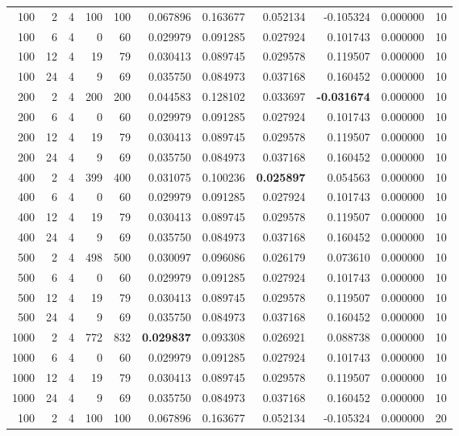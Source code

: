 \begin{table}
\begin{tabular}{rrrrrrrrrrr}
100 & 2 & 4 & 100 & 100 & 0.067896 & 0.163677 & 0.052134 & -0.105324 & 0.000000 & 10 \\
100 & 6 & 4 & 0 & 60 & 0.029979 & 0.091285 & 0.027924 & 0.101743 & 0.000000 & 10 \\
100 & 12 & 4 & 19 & 79 & 0.030413 & 0.089745 & 0.029578 & 0.119507 & 0.000000 & 10 \\
100 & 24 & 4 & 9 & 69 & 0.035750 & 0.084973 & 0.037168 & 0.160452 & 0.000000 & 10 \\
200 & 2 & 4 & 200 & 200 & 0.044583 & 0.128102 & 0.033697 & \textbf{-0.031674} & 0.000000 & 10 \\
200 & 6 & 4 & 0 & 60 & 0.029979 & 0.091285 & 0.027924 & 0.101743 & 0.000000 & 10 \\
200 & 12 & 4 & 19 & 79 & 0.030413 & 0.089745 & 0.029578 & 0.119507 & 0.000000 & 10 \\
200 & 24 & 4 & 9 & 69 & 0.035750 & 0.084973 & 0.037168 & 0.160452 & 0.000000 & 10 \\
400 & 2 & 4 & 399 & 400 & 0.031075 & 0.100236 & \textbf{0.025897} & 0.054563 & 0.000000 & 10 \\
400 & 6 & 4 & 0 & 60 & 0.029979 & 0.091285 & 0.027924 & 0.101743 & 0.000000 & 10 \\
400 & 12 & 4 & 19 & 79 & 0.030413 & 0.089745 & 0.029578 & 0.119507 & 0.000000 & 10 \\
400 & 24 & 4 & 9 & 69 & 0.035750 & 0.084973 & 0.037168 & 0.160452 & 0.000000 & 10 \\
500 & 2 & 4 & 498 & 500 & 0.030097 & 0.096086 & 0.026179 & 0.073610 & 0.000000 & 10 \\
500 & 6 & 4 & 0 & 60 & 0.029979 & 0.091285 & 0.027924 & 0.101743 & 0.000000 & 10 \\
500 & 12 & 4 & 19 & 79 & 0.030413 & 0.089745 & 0.029578 & 0.119507 & 0.000000 & 10 \\
500 & 24 & 4 & 9 & 69 & 0.035750 & 0.084973 & 0.037168 & 0.160452 & 0.000000 & 10 \\
1000 & 2 & 4 & 772 & 832 & \textbf{0.029837} & 0.093308 & 0.026921 & 0.088738 & 0.000000 & 10 \\
1000 & 6 & 4 & 0 & 60 & 0.029979 & 0.091285 & 0.027924 & 0.101743 & 0.000000 & 10 \\
1000 & 12 & 4 & 19 & 79 & 0.030413 & 0.089745 & 0.029578 & 0.119507 & 0.000000 & 10 \\
1000 & 24 & 4 & 9 & 69 & 0.035750 & 0.084973 & 0.037168 & 0.160452 & 0.000000 & 10 \\
100 & 2 & 4 & 100 & 100 & 0.067896 & 0.163677 & 0.052134 & -0.105324 & 0.000000 & 20 \\

\end{tabular}
\end{table}
